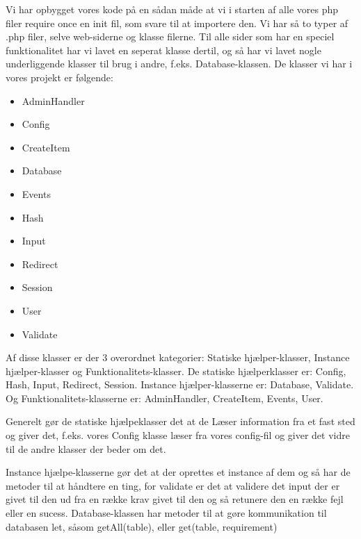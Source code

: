 \documentclass[12pt,a4paper]{report} %
\begin{document}
        Vi har opbygget vores kode på en sådan måde at vi i starten af alle vores php filer require once en init fil, som svare til at importere den. Vi har så to typer af .php filer, selve web-siderne og klasse filerne. Til alle sider som har en speciel funktionalitet har vi lavet en seperat klasse dertil, og så har vi lavet nogle underliggende klasser til brug i andre, f.eks. Database-klassen. De klasser vi har i vores projekt er følgende:
        \begin{itemize}
            \item AdminHandler
            \item Config
            \item CreateItem
            \item Database
            \item Events
            \item Hash
            \item Input
            \item Redirect
            \item Session
            \item User
            \item Validate
        \end{itemize}
        Af disse klasser er der 3 overordnet kategorier: Statiske hjælper-klasser, Instance hjælper-klasser og Funktionalitets-klasser. 
        \newline\newline De statiske hjælperklasser er: Config, Hash, Input, Redirect, Session.
        \newline Instance hjælper-klasserne er: Database, Validate.
        \newline Og Funktionalitets-klasserne er: AdminHandler, CreateItem, Events, User.\par
        \noindent Generelt gør de statiske hjælpeklasser det at de Læser information fra et fast sted og giver det, f.eks. vores Config klasse læser fra vores config-fil og giver det vidre til de andre klasser der beder om det.\par
        \noindent Instance hjælpe-klasserne gør det at der oprettes et instance af dem og så har de metoder til at håndtere en ting, for validate er det at validere det input der er givet til den ud fra en række krav givet til den og så retunere den en række fejl eller en sucess. Database-klassen har metoder til at gøre kommunikation til databasen let, såsom getAll(table), eller get(table, requirement)\par
\end{document}
